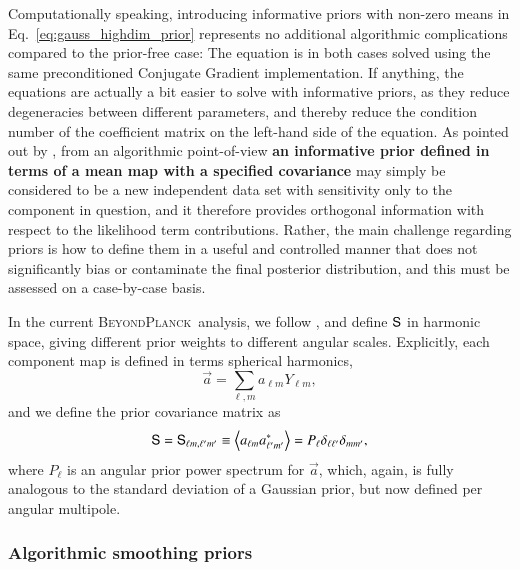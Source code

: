 \documentclass[twocolumn]{aa}
\renewcommand{\a}[0]{\vec{a}}
\renewcommand{\S}[0]{\tens{S}}
\newcommand{\BP}{\textsc{BeyondPlanck}}
\begin{document}
Computationally speaking, introducing informative priors with non-zero
means in Eq.~\eqref{eq:gauss_highdim_prior} represents no additional
algorithmic complications compared to the prior-free case: The
equation is in both cases solved using the same preconditioned
Conjugate Gradient implementation. If anything, the equations are
actually a bit easier to solve with informative priors, as they reduce
degeneracies between different parameters, and thereby reduce the
condition number of the coefficient matrix on the left-hand side of
the equation. As pointed out by \citet{seljebotn:2019}, from an
algorithmic point-of-view {\bf an informative prior defined in terms
  of a mean map with a specified covariance} may simply be considered
to be a new independent data set with sensitivity only to the
component in question, and it therefore provides orthogonal
information with respect to the likelihood term contributions. Rather,
the main challenge regarding priors is how to define them in a useful
and controlled manner that does not significantly bias or contaminate
the final posterior distribution, and this must be assessed on a
case-by-case basis.

In the current \BP\ analysis, we follow \citet{planck2016-l04}, and
define $\S$ in harmonic space, giving different prior weights to
different angular scales. Explicitly, each component map is defined in
terms spherical harmonics,
\begin{equation}
  \a = \sum_{\ell,m} a_{\ell m} Y_{\ell m},
\end{equation}
and we define the prior covariance matrix as
\begin{equation}
  \S = \S_{\ell m,\ell'm'} \equiv \left<a_{\ell m}a^*_{\ell' m'}\right> = P_{\ell}\delta_{\ell\ell'}\delta_{mm'},
\end{equation}
where $P_{\ell}$ is an angular prior power spectrum for $\a$, which,
again, is fully analogous to the standard deviation of a Gaussian
prior, but now defined per angular multipole.

\subsubsection{Algorithmic smoothing priors}
\end{document}
